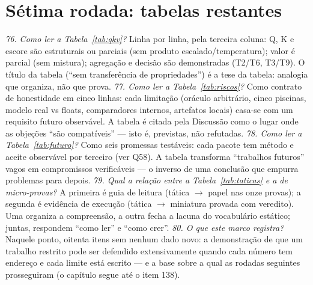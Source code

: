 \section{Sétima rodada: tabelas restantes}
\textit{76. Como ler a Tabela~\ref{tab:qkv}?} Linha por linha, pela terceira coluna: Q, K e escore são estruturais ou parciais (sem produto escalado/temperatura); valor é parcial (sem mistura); agregação e decisão são demonstradas (T2/T6, T3/T9). O título da tabela (``sem transferência de propriedades'') é a tese da tabela: analogia que organiza, não que prova.
\textit{77. Como ler a Tabela~\ref{tab:riscos}?} Como contrato de honestidade em cinco linhas: cada limitação (oráculo arbitrário, cinco piscinas, modelo real vs floats, comparadores internos, artefatos locais) casa-se com um requisito futuro observável. A tabela é citada pela Discussão como o lugar onde as objeções ``são compatíveis'' --- isto é, previstas, não refutadas.
\textit{78. Como ler a Tabela~\ref{tab:futuro}?} Como seis promessas testáveis: cada pacote tem método e aceite observável por terceiro (ver Q58). A tabela transforma ``trabalhos futuros'' vagos em compromissos verificáveis --- o inverso de uma conclusão que empurra problemas para depois.
\textit{79. Qual a relação entre a Tabela~\ref{tab:taticas} e a de micro-provas?} A primeira é guia de leitura (tática $\to$ papel nas onze provas); a segunda é evidência de execução (tática $\to$ miniatura provada com veredito). Uma organiza a compreensão, a outra fecha a lacuna do vocabulário estático; juntas, respondem ``como ler'' e ``como crer''.
\textit{80. O que este marco registra?} Naquele ponto, oitenta itens sem nenhum dado novo: a demonstração de que um trabalho restrito pode ser defendido extensivamente quando cada número tem endereço e cada limite está escrito --- e a base sobre a qual as rodadas seguintes prosseguiram (o capítulo segue até o item 138).
